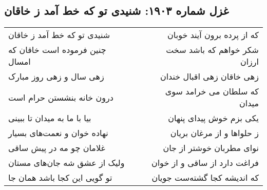 \begin{center}
\section*{غزل شماره ۱۹۰۳: شنیدی تو که خط آمد ز خاقان}
\label{sec:1903}
\begin{longtable}{l p{0.5cm} r}
شنیدی تو که خط آمد ز خاقان
&&
که از پرده برون آیند خوبان
\\
چنین فرموده است خاقان که امسال
&&
شکر خواهم که باشد سخت ارزان
\\
زهی سال و زهی روز مبارک
&&
زهی خاقان زهی اقبال خندان
\\
درون خانه بنشستن حرام است
&&
که سلطان می خرامد سوی میدان
\\
بیا با ما به میدان تا ببینی
&&
یکی بزم خوش پیدای پنهان
\\
نهاده خوان و نعمت‌های بسیار
&&
ز حلواها و از مرغان بریان
\\
غلامان چو مه در پیش ساقی
&&
نوای مطربان خوشتر از جان
\\
ولیک از عشق شه جان‌های مستان
&&
فراغت دارد از ساقی و از خوان
\\
تو گویی این کجا باشد همان جا
&&
که اندیشه کجا گشته‌ست جویان
\\
\end{longtable}
\end{center}
